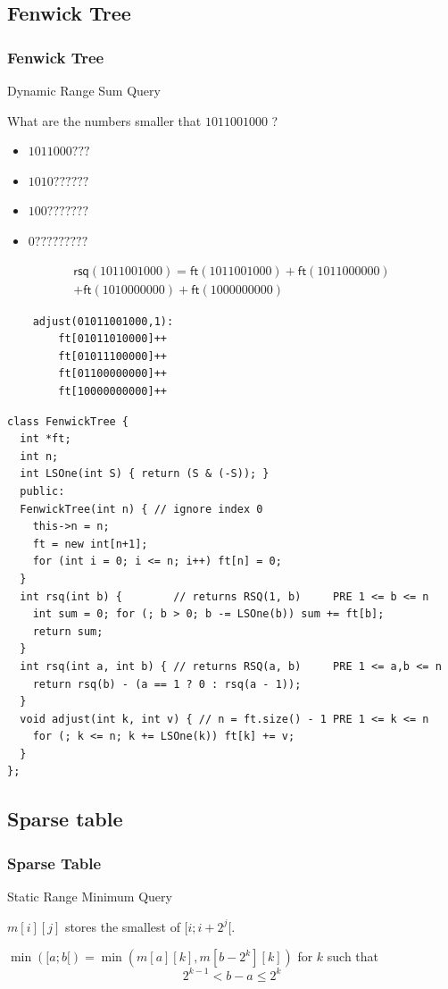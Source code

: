 \documentclass[10pt,svgnames,usenames,table]{beamer} %
\begin{document}
\subsection{Fenwick Tree}
\begin{frame}
  \frametitle{Fenwick Tree}
  Dynamic Range Sum Query

  What are the numbers smaller that $1011001000$ ?
  \begin{itemize}
    \item $1011000???$
    \item $1010??????$
    \item $100???????$
    \item $0?????????$
  \end{itemize}
  \begin{multline*}
    \mathsf{rsq}(1011001000)
    = \mathsf{ft}(1011001000)
    + \mathsf{ft}(1011000000)\\
    + \mathsf{ft}(1010000000)
    + \mathsf{ft}(1000000000)
  \end{multline*}

  \begin{lstlisting}
    adjust(01011001000,1):
        ft[01011010000]++
        ft[01011100000]++
        ft[01100000000]++
        ft[10000000000]++
  \end{lstlisting}

  \framebreak
  \begin{lstlisting}
class FenwickTree {
  int *ft;
  int n;
  int LSOne(int S) { return (S & (-S)); }
  public:
  FenwickTree(int n) { // ignore index 0
    this->n = n;
    ft = new int[n+1];
    for (int i = 0; i <= n; i++) ft[n] = 0;
  }
  int rsq(int b) {        // returns RSQ(1, b)     PRE 1 <= b <= n
    int sum = 0; for (; b > 0; b -= LSOne(b)) sum += ft[b];
    return sum;
  }
  int rsq(int a, int b) { // returns RSQ(a, b)     PRE 1 <= a,b <= n
    return rsq(b) - (a == 1 ? 0 : rsq(a - 1));
  }
  void adjust(int k, int v) { // n = ft.size() - 1 PRE 1 <= k <= n
    for (; k <= n; k += LSOne(k)) ft[k] += v;
  }
};
  \end{lstlisting}
\end{frame}

\subsection{Sparse table}
\begin{frame}
  \frametitle{Sparse Table}
  Static Range Minimum Query

  $m[i][j]$ stores the smallest of $[i;i+2^j[$.

  $\min([a; b[) = \min(m[a][k], m[b-2^k][k])$ for $k$ such that
  $$2^{k-1} < b-a \leq 2^k$$
\end{frame}
\end{document}
